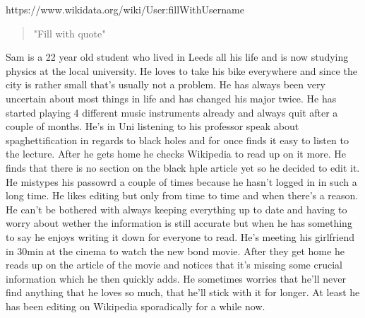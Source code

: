 \documentclass{article}
\begin{document}
\pagebreak

https://www.wikidata.org/wiki/User:fillWithUsername
\begin{quote}
"Fill with quote"
\end{quote}

Sam is a 22 year old student who lived in Leeds all his life and is now studying physics at the local university. He loves to take his bike everywhere and since the city is rather small that's usually not a problem. He has always been very uncertain about most things in life and has changed his major twice. He has started playing 4 different music instruments already and always quit after a couple of months. 
He's in Uni listening to his professor speak about spaghettification in regards to black holes and for once finds it easy to listen to the lecture. After he gets home he checks Wikipedia to read up on it more. He finds that there is no section on the black hple article yet so he decided to edit it. He mistypes his passowrd a couple of times because he hasn't logged in in such a long time. He likes editing but only from time to time and when there's a reason. He can't be bothered with always keeping everything up to date and having to worry about wether the information is still accurate but when he has something to say he enjoys writing it down for everyone to read. He's meeting his girlfriend in 30min at the cinema to watch the new bond movie. After they get home he reads up on the article of the movie and notices that it's missing some crucial information which he then quickly adds. He sometimes worries that he'll never find anything that he loves so much, that he'll stick with it for longer. At least he has been editing on Wikipedia sporadically for a while now. 
\end{document}
